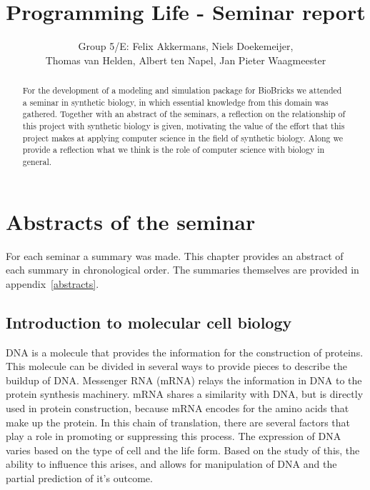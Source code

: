 \documentclass[a4paper]{article}
\title{Programming Life - Seminar report}
\author{
Group 5/E: 
 Felix Akkermans,  
Niels Doekemeijer, \\
Thomas van Helden, 
Albert ten Napel,
Jan Pieter Waagmeester 
}
\begin{document}
\maketitle

\begin{abstract}
\noindent For the  development of a modeling and simulation package for BioBricks we attended a seminar in synthetic biology, in which essential knowledge from this domain was gathered. Together with an abstract of the seminars, a reflection on the relationship of this project with synthetic biology is given, motivating the value of the effort that this project makes at applying computer science in the field of synthetic biology. Along we provide a reflection what we think is the role of computer science with biology in general.
\end{abstract}

\section{Abstracts of the seminar}
For each seminar a summary was made. This chapter provides an abstract of each summary in chronological order. The summaries themselves are provided in appendix~\ref{abstracts}.

\subsection{Introduction to molecular cell biology}
DNA is a molecule that provides the information for the construction of proteins. This molecule can be divided in several ways to provide pieces to describe the buildup of DNA. Messenger RNA (mRNA) relays the information in DNA to the protein synthesis machinery. mRNA shares a similarity with DNA, but is directly used in protein construction, because mRNA encodes for the amino acids that  make up the protein. In this chain of translation, there are several factors that play a role in promoting or suppressing this process. The expression of DNA varies based on the type of cell and the life form. Based on the study of this, the ability to influence this arises, and allows for manipulation of DNA and the partial prediction of it's outcome. 
\end{document}
